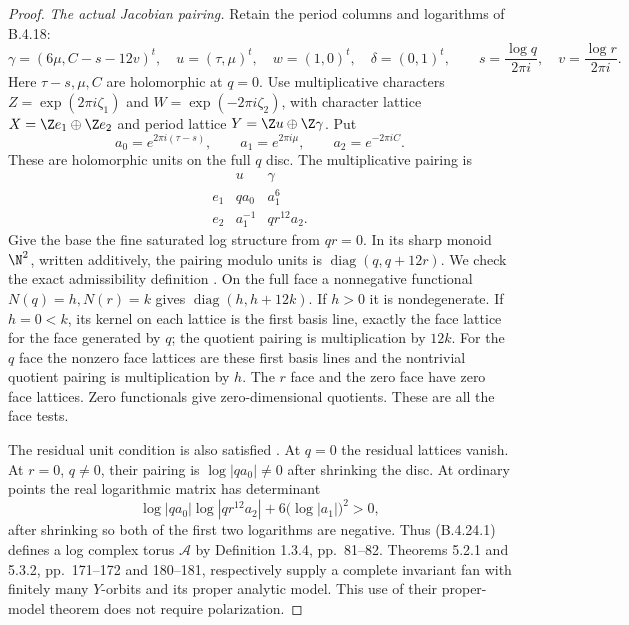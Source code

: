 \begin{proof}
\emph{The actual Jacobian pairing.}
Retain the period columns and logarithms of B.4.18:
\[
 \gamma=(6\mu,C-s-12v)^t,\quad
 u=(\tau,\mu)^t,\quad w=(1,0)^t,\quad\delta=(0,1)^t,
 \qquad
 s=\frac{\log q}{2\pi i},\quad
 v=\frac{\log r}{2\pi i}.
\]
Here $\tau-s,\mu,C$ are holomorphic at $q=0$.
Use multiplicative characters
$Z=\exp(2\pi i\zeta_1)$ and
$W=\exp(-2\pi i\zeta_2)$, with character lattice
$X=\Z e_1\oplus\Z e_2$ and period lattice
$Y=\Z u\oplus\Z\gamma$. Put
\[
 a_0=e^{2\pi i(\tau-s)},\qquad
 a_1=e^{2\pi i\mu},\qquad a_2=e^{-2\pi iC}.
\]
These are holomorphic units on the full $q$ disc.
The multiplicative pairing is
\[
 \begin{array}{c|cc}
       &u&\gamma\\\hline
 e_1&q a_0&a_1^6\\
 e_2&a_1^{-1}&q r^{12}a_2.
 \end{array}
 \tag{B.4.24.1}
\]
Give the base the fine saturated log structure from
$qr=0$. In its sharp monoid $\N^2$, written additively,
the pairing modulo units is $\operatorname{diag}(q,q+12r)$.
We check the exact admissibility definition
\citep[Definition 1.2.3, pp.~77--78]{KKN2008Root}.
On the full face a nonnegative functional
$N(q)=h,N(r)=k$ gives
$\operatorname{diag}(h,h+12k)$. If $h>0$ it is
nondegenerate. If $h=0<k$, its kernel on each lattice
is the first basis line, exactly the face lattice
for the face generated by $q$; the quotient pairing
is multiplication by $12k$. For the $q$ face the
nonzero face lattices are these first basis lines
and the nontrivial quotient pairing is multiplication
by $h$. The $r$ face and the zero face have zero
face lattices. Zero functionals give zero-dimensional
quotients. These are all the face tests.

The residual unit condition is also satisfied
\citep[Definition 1.2.6, p.~79]{KKN2008Root}.
At $q=0$ the residual lattices vanish. At $r=0$,
$q\ne0$, their pairing is $\log|q a_0|\ne0$ after
shrinking the disc. At ordinary points the real
logarithmic matrix has determinant
\[
 \log|q a_0|\log|q r^{12}a_2|
                 +6\bigl(\log|a_1|\bigr)^2>0,
\]
after shrinking so both of the first two logarithms
are negative. Thus (B.4.24.1) defines a log complex
torus $\mathcal A$ by Definition 1.3.4, pp.~81--82.
Theorems 5.2.1 and 5.3.2, pp.~171--172 and 180--181,
respectively supply a complete invariant fan with
finitely many $Y$-orbits and its proper analytic
model. This use of their proper-model theorem does
not require polarization.


\end{proof}

